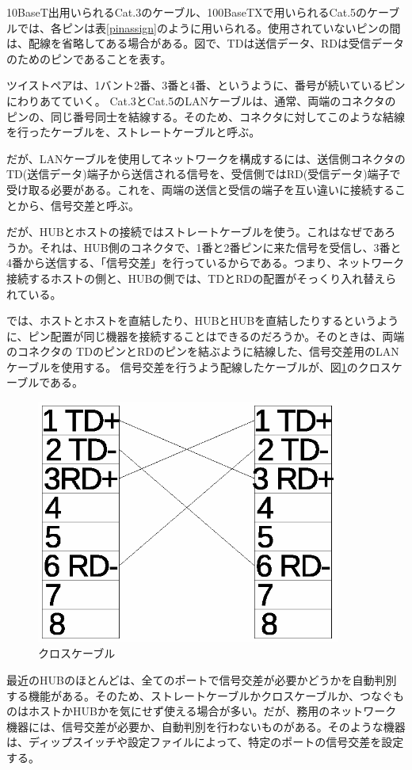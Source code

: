 10BaseT出用いられるCat.3のケーブル、100BaseTXで用いられるCat.5のケーブルでは、各ピンは表\ref{pinassign}のように用いられる。使用されていないピンの間は、配線を省略してある場合がある。図で、TDは送信データ、RDは受信データのためのピンであることを表す。

ツイストペアは、1バント2番、3番と4番、というように、番号が続いているピンにわりあてていく。
Cat.3とCat.5のLANケーブルは、通常、両端のコネクタのピンの、同じ番号同士を結線する。そのため、コネクタに対してこのような結線を行ったケーブルを、ストレートケーブルと呼ぶ。

だが、LANケーブルを使用してネットワークを構成するには、送信側コネクタのTD(送信データ)端子から送信される信号を、受信側ではRD(受信データ)端子で受け取る必要がある。これを、両端の送信と受信の端子を互い違いに接続することから、信号交差と呼ぶ。

だが、HUBとホストの接続ではストレートケーブルを使う。これはなぜであろうか。それは、HUB側のコネクタで、1番と2番ピンに来た信号を受信し、3番と4番から送信する、「信号交差」を行っているからである。つまり、ネットワーク接続するホストの側と、HUBの側では、TDとRDの配置がそっくり入れ替えられている。

では、ホストとホストを直結したり、HUBとHUBを直結したりするというように、ピン配置が同じ機器を接続することはできるのだろうか。そのときは、両端のコネクタの TDのピンとRDのピンを結ぶように結線した、信号交差用のLANケーブルを使用する。
信号交差を行うよう配線したケーブルが、図\ref{fig:cross}のクロスケーブルである。

\begin{figure}[htbp]
	\includegraphics[width=10cm,clip]{draw/cat5cross.eps}
	\caption{クロスケーブル}
	\label{fig:cross}
\end{figure}


最近のHUBのほとんどは、全てのポートで信号交差が必要かどうかを自動判別する機能がある。そのため、ストレートケーブルかクロスケーブルか、つなぐものはホストかHUBかを気にせず使える場合が多い。だが、務用のネットワーク機器には、信号交差が必要か、自動判別を行わないものがある。そのような機器は、ディップスイッチや設定ファイルによって、特定のポートの信号交差を設定する。

